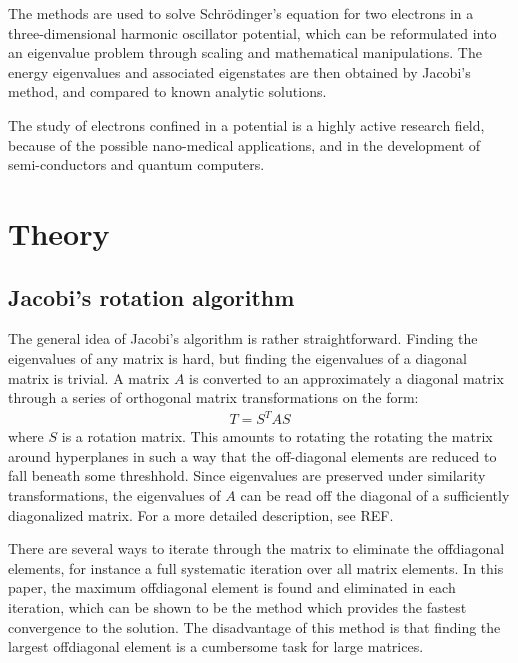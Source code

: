 \documentclass[aps,reprint]{revtex4-1}
\begin{document}
The methods are used to solve Schrödinger's equation for two electrons in a
three-dimensional harmonic oscillator potential, which can be reformulated into
an eigenvalue problem through scaling and mathematical manipulations. The
energy eigenvalues and associated eigenstates are then obtained by Jacobi's method,
and compared to known analytic solutions.

The study of electrons confined in a potential is a highly active research field,
because of the possible nano-medical applications, and in the development of semi-conductors
and quantum computers.
\section{Theory}
\label{sec:theory}
\subsection{Jacobi's rotation algorithm}
The general idea of Jacobi's algorithm is rather straightforward. Finding the
eigenvalues of any matrix is hard, but finding the eigenvalues of a diagonal
matrix is trivial. A matrix \(A\) is converted to an approximately a diagonal
matrix through a series of orthogonal matrix transformations on the form:
\begin{align*}
  T = S^T A S
\end{align*}
where $S$ is a rotation matrix. This amounts to rotating the rotating the matrix
around hyperplanes in such a way that the off-diagonal elements are reduced to
fall beneath some threshhold.
Since eigenvalues are preserved under similarity
transformations, the eigenvalues of \(A\) can be read off the diagonal of a
sufficiently diagonalized matrix. For a more detailed description, see REF.

There are several ways to iterate through the matrix to eliminate the offdiagonal
elements, for instance a full systematic iteration over all matrix elements. In this paper,
the maximum offdiagonal element is found and eliminated in each iteration, which can be shown to be
the method which provides the fastest convergence to the solution. The disadvantage of this method
is that finding the largest offdiagonal element is a cumbersome task for large matrices.
\end{document}

